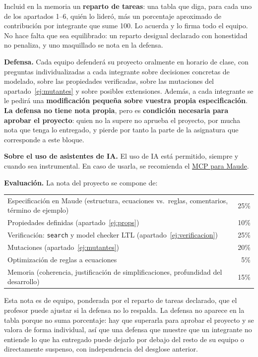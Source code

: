 Incluid en la memoria un \textbf{reparto de tareas}: una tabla que diga,
para cada uno de los apartados 1--6, qui\'en lo lider\'o, m\'as un
porcentaje aproximado de contribuci\'on por integrante que sume 100. Lo
acuerda y lo firma todo el equipo. No hace falta que sea equilibrado: un
reparto desigual declarado con honestidad no penaliza, y uno maquillado se
nota en la defensa.

\smallskip
\noindent\textbf{Defensa.} Cada equipo defender\'a su proyecto oralmente en
horario de clase, con preguntas individualizadas a cada integrante sobre
decisiones concretas de modelado, sobre las propiedades verificadas, sobre
las mutaciones del apartado~\ref{ej:mutantes} y sobre posibles extensiones.
%
Adem\'as, a cada integrante se le pedir\'a una \textbf{modificaci\'on
peque\~na sobre vuestra propia especificaci\'on}.
%
\textbf{La defensa no tiene nota propia}, pero es \textbf{condici\'on
necesaria para aprobar el proyecto}: quien no la supere no aprueba el
proyecto, por mucha nota que tenga lo entregado, y pierde por tanto la
parte de la asignatura que corresponde a este bloque.

\smallskip
\noindent\textbf{Sobre el uso de asistentes de IA.} El uso de IA está permitido,
siempre y cuando sea instrumental. En caso de usarla, se recomienda el
\href{https://pypi.org/project/harold-mcp/}{MCP para Maude}.

\bigskip
\noindent\textbf{Evaluaci\'on.} La nota del proyecto se compone de:

\begin{center}
\begin{tabular}{lr}
Especificaci\'on en Maude (estructura, ecuaciones vs.\ reglas, comentarios, t\'ermino de ejemplo) & 25\% \\
Propiedades definidas (apartado~\ref{ej:props}) & 10\% \\
Verificaci\'on: \texttt{search} y model checker LTL (apartado~\ref{ej:verificacion}) & 25\% \\
Mutaciones (apartado~\ref{ej:mutantes}) & 20\% \\
Optimizaci\'on de reglas a ecuaciones & 5\% \\
Memoria (coherencia, justificaci\'on de simplificaciones, profundidad del desarrollo) & 15\% \\
\end{tabular}
\end{center}

\noindent Esta nota es de equipo, ponderada por el reparto de tareas
declarado, que el profesor puede ajustar si la defensa no lo respalda. La
defensa no aparece en la tabla porque no suma porcentaje: hay que superarla
para aprobar el proyecto y se valora de forma individual, as\'i que una
defensa que muestre que un integrante no entiende lo que ha entregado puede
dejarlo por debajo del resto de su equipo o directamente suspenso, con
independencia del desglose anterior.


